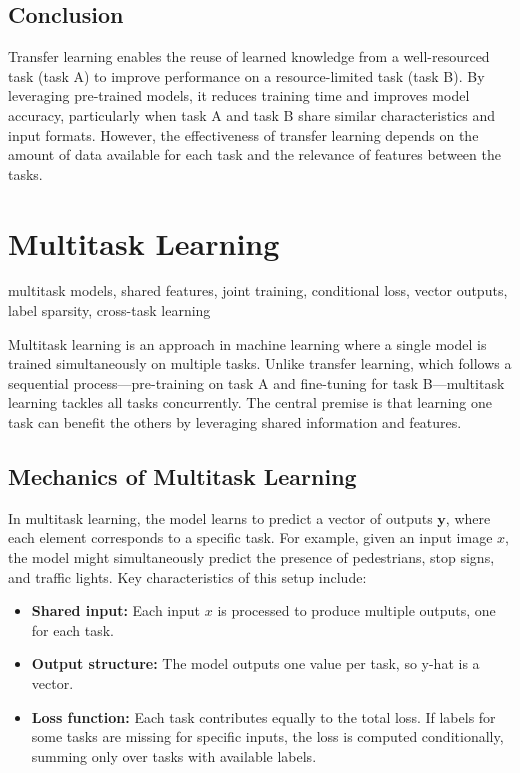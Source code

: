 \documentclass[12pt,openany]{book}
\begin{document}
\subsection{Conclusion}

Transfer learning enables the reuse of learned knowledge from a well-resourced task (task A) to improve performance on a resource-limited task (task B). By leveraging pre-trained models, it reduces training time and improves model accuracy, particularly when task A and task B share similar characteristics and input formats. However, the effectiveness of transfer learning depends on the amount of data available for each task and the relevance of features between the tasks. 



\section{Multitask Learning}

\begin{keywordsbox}
multitask models, shared features, joint training, conditional loss, vector outputs, label sparsity, cross-task learning
\end{keywordsbox}

Multitask learning is an approach in machine learning where a single model is trained simultaneously on multiple tasks. Unlike transfer learning, which follows a sequential process—pre-training on task A and fine-tuning for task B—multitask learning tackles all tasks concurrently. The central premise is that learning one task can benefit the others by leveraging shared information and features.


\subsection{Mechanics of Multitask Learning}

In multitask learning, the model learns to predict a vector of outputs \( \mathbf{y} \), where each element corresponds to a specific task. For example, given an input image \( x \), the model might simultaneously predict the presence of pedestrians, stop signs, and traffic lights. Key characteristics of this setup include:
\begin{itemize}
    \item \textbf{Shared input:} Each input \( x \) is processed to produce multiple outputs, one for each task.
    \item \textbf{Output structure:} The model outputs one value per task, so y-hat is a vector.
    \item \textbf{Loss function:} Each task contributes equally to the total loss. If labels for some tasks are missing for specific inputs, the loss is computed conditionally, summing only over tasks with available labels.
\end{itemize}
\end{document}
